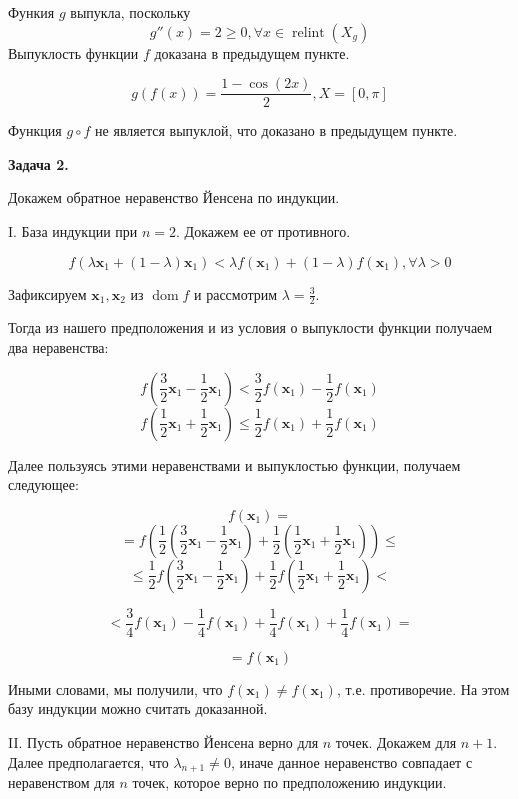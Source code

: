 \documentclass[12pt]{article}
\DeclareMathOperator*{\relint}{relint}
\DeclareMathOperator*{\dom}{dom}
\begin{document}
Функия $g$ выпукла, поскольку
$$g''(x) = 2 \geq 0, \forall x \in \relint(X_g)$$
Выпуклость функции $f$ доказана в предыдущем пункте. 

$$g(f(x)) = \frac{1-\cos(2x)}{2}, X = [0, \pi]$$

Функция $g \circ f$ не является выпуклой, что доказано в предыдущем пункте.

\begin{center}
	\textbf{Задача 2.}
\end{center}

Докажем обратное неравенство Йенсена по индукции.

I. База индукции при $n=2$. Докажем ее от противного.

$$f(\lambda \textbf{x}_1 + (1-\lambda)\textbf{x}_1) < \lambda f(\textbf{x}_1) + (1-\lambda)f(\textbf{x}_1), \forall \lambda > 0$$

Зафиксируем $\textbf{x}_1,\textbf{x}_2$ из $\dom f$ и рассмотрим $\lambda = \frac{3}{2}$.

Тогда из нашего предположения и  из условия о выпуклости функции получаем два неравенства:

$$f\left(\frac{3}{2} \textbf{x}_1 - \frac{1}{2}\textbf{x}_1\right) < \frac{3}{2} f(\textbf{x}_1) - \frac{1}{2}f(\textbf{x}_1)$$
$$f\left(\frac{1}{2} \textbf{x}_1 + \frac{1}{2}\textbf{x}_1\right) \leq \frac{1}{2} f(\textbf{x}_1) + \frac{1}{2}f(\textbf{x}_1)$$

Далее пользуясь этими неравенствами и выпуклостью функции, получаем следующее:

$$f(\textbf{x}_1) = $$
$$=f\left(\frac{1}{2}\left(\frac{3}{2} \textbf{x}_1 - \frac{1}{2}\textbf{x}_1\right)+\frac{1}{2}\left(\frac{1}{2} \textbf{x}_1 + \frac{1}{2}\textbf{x}_1\right)\right)\leq$$
$$\leq \frac{1}{2}f\left(\frac{3}{2} \textbf{x}_1 - \frac{1}{2}\textbf{x}_1\right)+\frac{1}{2}f\left(\frac{1}{2} \textbf{x}_1 + \frac{1}{2}\textbf{x}_1\right) <$$

$$<\frac{3}{4} f(\textbf{x}_1) - \frac{1}{4}f(\textbf{x}_1) + \frac{1}{4} f(\textbf{x}_1) + \frac{1}{4}f(\textbf{x}_1)=$$

$$=f(\textbf{x}_1)$$

Иными словами, мы получили, что $f(\textbf{x}_1)\neq f(\textbf{x}_1)$, т.е. противоречие. На этом базу индукции можно считать доказанной.

II. Пусть обратное неравенство Йенсена верно для $n$ точек. Докажем для $n+1$. Далее предполагается, что $\lambda_{n+1}\neq 0$, иначе данное неравенство совпадает с неравенством для $n$ точек, которое верно по предположению индукции.
\end{document}
